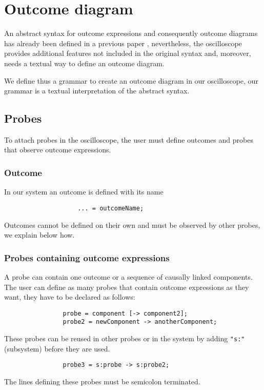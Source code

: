   \section{Outcome diagram}
        An abstract syntax for outcome expressions and consequently outcome diagrams has already been defined in a previous paper \cite{art}, nevertheless, the oscilloscope provides additional features not included in the original syntax and, moreover, needs a textual way to define an outcome diagram. 
       
        We define thus a grammar to create an outcome diagram in our oscilloscope, our grammar is a textual interpretation of the abstract syntax.
        \subsection{Probes}
            To attach probes in the oscilloscope, the user must define outcomes and probes that observe outcome expressions.
            \subsubsection{Outcome}
                In our system an outcome is defined with its name
                \begin{verbatim}
                    ... = outcomeName;
                \end{verbatim}
            Outcomes cannot be defined on their own and must be observed by other probes, we explain below how.
        \subsubsection{Probes containing outcome expressions}
            A probe can contain one outcome or  a sequence of causally linked components.
            The user can define as many probes that contain outcome expressions as they want, they have to be declared as follows:
            \begin{verbatim}
                probe = component [-> component2];
                probe2 = newComponent -> anotherComponent;
            \end{verbatim}
    
            These probes can be reused in other probes or in the system by adding \texttt{"s:"} (subsystem) before they are used.
            \begin{verbatim}
                probe3 = s:probe -> s:probe2;
            \end{verbatim}
        The lines defining these probes must be semicolon terminated. 
